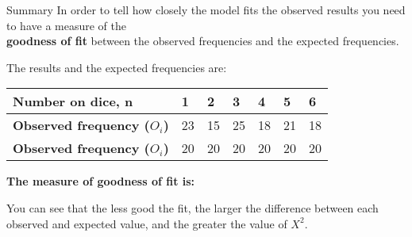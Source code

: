 \documentclass[fleqn]{article}
\begin{document}
\begin{mybox2}[colbacktitle=WildStrawberry]{Summary}
    In order to tell how closely the model fits the observed results you need to have a measure of the \\\textbf{goodness of fit} between the observed frequencies and the expected frequencies.
    
    The results and the expected frequencies are:
    
    \begin{center}\vspace{-2mm}
    \begin{minipage}[t]{0.8\linewidth}
        \begin{tabularx}{\textwidth}{|X|*6{P{11mm}|}}
            \hline
            \textbf{Number on dice, n}          & 1  & 2  & 3  & 4  & 5  & 6        \\\hline
            \textbf{Observed frequency ($O_i$)} & 23 & 15 & 25 & 18 & 21 & 18       \\\hline
            \textbf{Observed frequency ($O_i$)} & 20 & 20 & 20 & 20 & 20 & 20       \\\hline
        \end{tabularx}
        \vspace{4mm}
    \end{minipage}
    \end{center}
    
    
    \textbf{The measure of goodness of fit is:}
    
    
    You can see that the less good the fit, the larger the difference between each observed and expected value, and the greater the value of $X^2$.
    

\end{mybox2}
\end{document}
